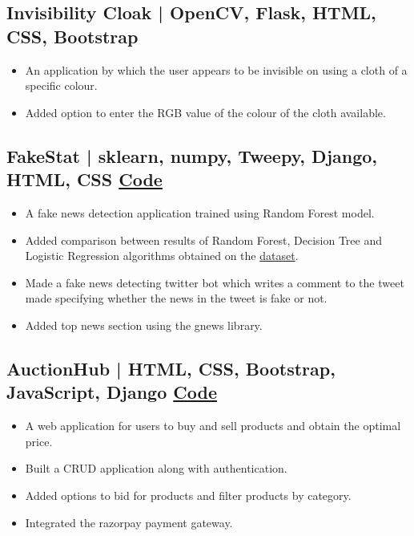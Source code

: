 \documentclass[10pt]{article}
\newenvironment{zitemize}{
\begin{itemize}\itemsep2pt \parskip0pt \parsep1pt}
{\end{itemize}\vspace{-0.5cm}}
\begin{document}


\subsection*{Invisibility Cloak | OpenCV, Flask, HTML, CSS, Bootstrap} 
    \begin{zitemize}
        \item An application by which the user appears to be invisible on using a cloth of a specific colour.
        \item Added option to enter the RGB value of the colour of the cloth available.
    \end{zitemize}


\subsection*{FakeStat | sklearn, numpy, Tweepy, Django, HTML, CSS \hfill \href{https://github.com/mihikagaonkar/FakeStat}{Code}} 
    \begin{zitemize}
        \item A fake news detection application trained using Random Forest model.
        \item Added comparison between results of Random Forest, Decision Tree and Logistic Regression algorithms obtained on the \href{https://www.kaggle.com/shubh0799/fake-news}{dataset}.
        \item Made a fake news detecting twitter bot which writes a comment to the tweet made specifying whether the news in the tweet is fake or not.
        \item Added top news section using the gnews library.
    \end{zitemize}
\subsection*{ AuctionHub | HTML, CSS, Bootstrap, JavaScript, Django \hfill \href{https://github.com/mihikagaonkar/tourit}{Code}} 
    \begin{zitemize}
        \item A  web  application  for users to buy and sell products and obtain the optimal price.
        \item Built a CRUD application along with authentication.
        \item Added options to bid for products and filter products by category.
        \item Integrated the razorpay payment gateway.
    \end{zitemize}
\end{document}
